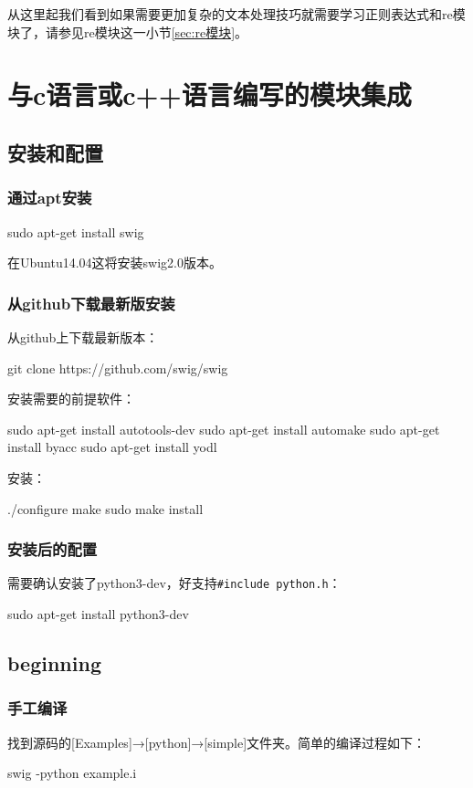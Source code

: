 \documentclass[12pt,oneside]{book}
\begin{document}
\begin{common-format}
从这里起我们看到如果需要更加复杂的文本处理技巧就需要学习正则表达式和re模块了，请参见re模块这一小节\ref{sec:re模块}。





\chapter{与c语言或c++语言编写的模块集成}
\section{安装和配置}
\subsection{通过apt安装}
\begin{tcbbash}[]
sudo apt-get install swig
\end{tcbbash}

在Ubuntu14.04这将安装swig2.0版本。

\subsection{从github下载最新版安装}
从github上下载最新版本：
\begin{tcbbash}[]
git  clone  https://github.com/swig/swig
\end{tcbbash}

安装需要的前提软件：
\begin{tcbbash}[]
sudo apt-get install autotools-dev
sudo apt-get install automake
sudo apt-get install byacc
sudo apt-get install yodl
\end{tcbbash}

安装：
\begin{tcbbash}[]
./configure
make
sudo make install
\end{tcbbash}

\subsection{安装后的配置}
需要确认安装了python3-dev，好支持\verb+#include python.h+：
\begin{tcbbash}[]
sudo apt-get install python3-dev
\end{tcbbash}

\section{beginning}
\subsection{手工编译}
找到源码的[Examples]→[python]→[simple]文件夹。简单的编译过程如下：
\begin{tcbbash}[]
swig -python example.i


\end{tcbbash}
\end{common-format}
\end{document}

